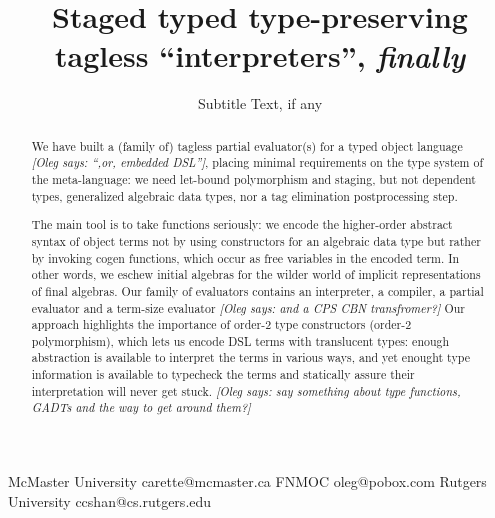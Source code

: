 \documentclass[preprint]{sigplanconf}
\newcommand{\oleg}[1]{{\it [Oleg says: #1]}}
\begin{document}
\copyrightdata{[to be supplied]} 


\title{Staged typed type-preserving tagless ``interpreters'', \emph{finally}}
\subtitle{Subtitle Text, if any}

           {McMaster University}
           {carette@mcmaster.ca}
           {FNMOC}
           {oleg@pobox.com}
           {Rutgers University}
           {ccshan@cs.rutgers.edu}

\maketitle

\begin{abstract}
We have built a (family of) tagless partial evaluator(s) for a typed object
language \oleg{``,or, embedded DSL''}, placing minimal requirements on
the type system of the meta-language:
we need let-bound polymorphism and staging, but not dependent
types, generalized algebraic data types, nor a tag elimination 
postprocessing step.

The main tool is to take functions seriously: we encode the
higher-order abstract syntax of object terms not by using constructors for
an algebraic data type but rather by invoking cogen functions, which occur as
free variables in the encoded term.  In other words, we eschew initial
algebras for the wilder world of implicit representations of final algebras.
Our family of evaluators contains an interpreter, a compiler, a partial
evaluator and a term-size evaluator \oleg{and a CPS CBN transfromer?}
Our approach highlights the importance of order-2 type constructors
(order-2 polymorphism), which lets us encode DSL terms with
translucent types: enough abstraction is available to interpret the
terms in various ways, and yet enought type information is available 
to typecheck the terms and statically assure their interpretation will
never get stuck.
\oleg{say something about type functions, GADTs and the way to get
  around them?}
\end{abstract}

\end{document}
